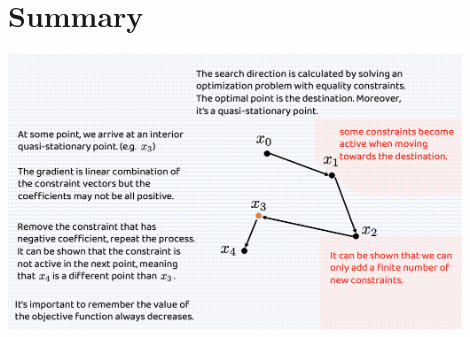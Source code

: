 \documentclass[letterpaper, oneside]{book}
\theoremstyle{definition}
\theoremstyle{remark}
\begin{document}
\section{Summary}
\begin{center}
	\includegraphics[width=0.9\textwidth]{summary_of_process.png}
\end{center}
\end{document}
